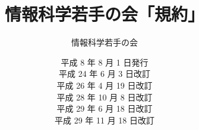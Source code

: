 \makeatletter
\def\labelenumi{第\theenumi 章　}
\def\theenumii{\arabic{enumii}}
\def\p@enumii{}
\def\labelenumii{第\theenumii 条　}
\def\theenumiii{\arabic{enumiii}}
\def\labelenumiii{\theenumiii　}
\def\p@enumiii{}
\makeatother
\def\@maketitle{
 \@title
 \@author
 \@date
 \vspace*{5cm}
}
\title{\Huge 情報科学若手の会「規約」}
\author{\huge 情報科学若手の会}
\date{\LARGE 平成   8 年  8 月   1 日発行\\
                         平成 24 年  6 月   3 日改訂\\
                         平成 26 年  4 月 19 日改訂\\
                         平成 28 年 10 月  8 日改訂\\
					     平成 29 年  6 月 18 日改訂\\
					     平成 29 年 11 月 18 日改訂}

